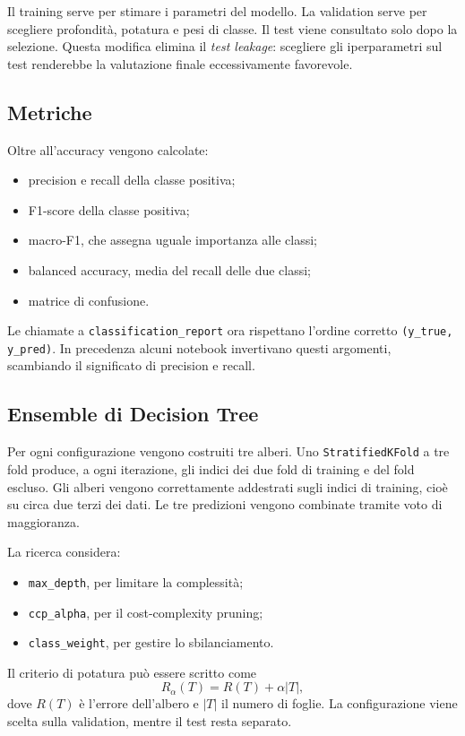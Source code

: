 \documentclass[11pt,a4paper]{article}
\begin{document}
Il training serve per stimare i parametri del modello. La validation serve per scegliere profondità, potatura e pesi di classe. Il test viene consultato solo dopo la selezione. Questa modifica elimina il \textit{test leakage}: scegliere gli iperparametri sul test renderebbe la valutazione finale eccessivamente favorevole.

\subsection{Metriche}

Oltre all'accuracy vengono calcolate:
\begin{itemize}
    \item precision e recall della classe positiva;
    \item F1-score della classe positiva;
    \item macro-F1, che assegna uguale importanza alle classi;
    \item balanced accuracy, media del recall delle due classi;
    \item matrice di confusione.
\end{itemize}

Le chiamate a \texttt{classification\_report} ora rispettano l'ordine corretto \texttt{(y\_true, y\_pred)}. In precedenza alcuni notebook invertivano questi argomenti, scambiando il significato di precision e recall.

\subsection{Ensemble di Decision Tree}

Per ogni configurazione vengono costruiti tre alberi. Uno \texttt{StratifiedKFold} a tre fold produce, a ogni iterazione, gli indici dei due fold di training e del fold escluso. Gli alberi vengono correttamente addestrati sugli indici di training, cioè su circa due terzi dei dati. Le tre predizioni vengono combinate tramite voto di maggioranza.

La ricerca considera:
\begin{itemize}
    \item \texttt{max\_depth}, per limitare la complessità;
    \item \texttt{ccp\_alpha}, per il cost-complexity pruning;
    \item \texttt{class\_weight}, per gestire lo sbilanciamento.
\end{itemize}

Il criterio di potatura può essere scritto come
\[
R_{\alpha}(T)=R(T)+\alpha |T|,
\]
dove $R(T)$ è l'errore dell'albero e $|T|$ il numero di foglie. La configurazione viene scelta sulla validation, mentre il test resta separato.
\end{document}
